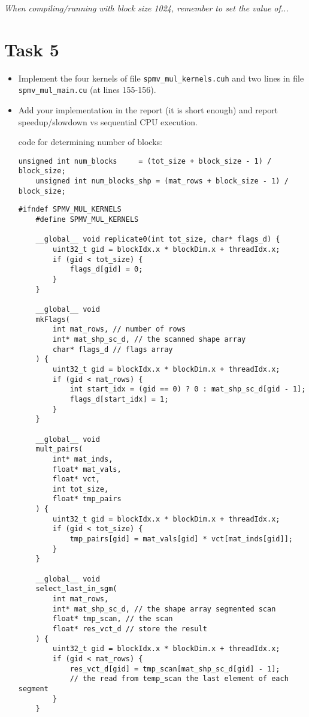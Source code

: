 \documentclass{article}
\begin{document}
\textit{When compiling/running with block size 1024, remember to set the value of...}

\section{Task 5}

\begin{itemize}
  \item Implement the four kernels of file \texttt{spmv\_mul\_kernels.cuh} and two lines in file \texttt{spmv\_mul\_main.cu} (at lines 155-156).
  \item Add your implementation in the report (it is short enough) and report speedup/slowdown vs sequential CPU execution.
  
  code for determining number of blocks:
  
  \begin{lstlisting}[language=cuda, basicstyle=\footnotesize]
    unsigned int num_blocks     = (tot_size + block_size - 1) / block_size;
    unsigned int num_blocks_shp = (mat_rows + block_size - 1) / block_size;  
  \end{lstlisting}

  \begin{lstlisting}[language=cuda, basicstyle=\footnotesize]
    #ifndef SPMV_MUL_KERNELS
    #define SPMV_MUL_KERNELS

    __global__ void replicate0(int tot_size, char* flags_d) {
        uint32_t gid = blockIdx.x * blockDim.x + threadIdx.x;
        if (gid < tot_size) {
            flags_d[gid] = 0;
        }
    }

    __global__ void
    mkFlags(
        int mat_rows, // number of rows 
        int* mat_shp_sc_d, // the scanned shape array
        char* flags_d // flags array
    ) {
        uint32_t gid = blockIdx.x * blockDim.x + threadIdx.x;
        if (gid < mat_rows) {
            int start_idx = (gid == 0) ? 0 : mat_shp_sc_d[gid - 1];
            flags_d[start_idx] = 1;
        }
    }

    __global__ void
    mult_pairs(
        int* mat_inds, 
        float* mat_vals, 
        float* vct, 
        int tot_size, 
        float* tmp_pairs
    ) {
        uint32_t gid = blockIdx.x * blockDim.x + threadIdx.x;
        if (gid < tot_size) {
            tmp_pairs[gid] = mat_vals[gid] * vct[mat_inds[gid]];
        }
    }

    __global__ void
    select_last_in_sgm(
        int mat_rows, 
        int* mat_shp_sc_d, // the shape array segmented scan
        float* tmp_scan, // the scan
        float* res_vct_d // store the result
    ) {
        uint32_t gid = blockIdx.x * blockDim.x + threadIdx.x;
        if (gid < mat_rows) {
            res_vct_d[gid] = tmp_scan[mat_shp_sc_d[gid] - 1]; 
            // the read from temp_scan the last element of each segment
        }
    }


\end{lstlisting}
\end{itemize}
\end{document}
